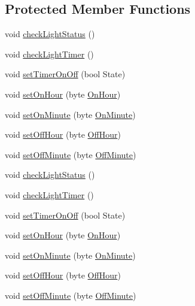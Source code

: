 \subsection*{Protected Member Functions}
\begin{DoxyCompactItemize}
\item 
void \hyperlink{class_lights_a358764e84694051f14f8cdc89dab44ee}{check\+Light\+Status} ()
\item 
void \hyperlink{class_lights_a291179d021dad8a22d3f27203fcaa819}{check\+Light\+Timer} ()
\item 
void \hyperlink{class_lights_a3c5051babf4dacdeecced14217f6f886}{set\+Timer\+On\+Off} (bool State)
\item 
void \hyperlink{class_lights_ad95bf16e17afbf909d480e995a3c214f}{set\+On\+Hour} (byte \hyperlink{class_lights_a40dc32d057dbf4c0e7e840fce2ac3a2d}{On\+Hour})
\item 
void \hyperlink{class_lights_a809f813dc9401c658869b44b44beac75}{set\+On\+Minute} (byte \hyperlink{class_lights_ac94ddb9da64af75953b178fb852ef936}{On\+Minute})
\item 
void \hyperlink{class_lights_a744c6694c60c9f003bf1f88273437d89}{set\+Off\+Hour} (byte \hyperlink{class_lights_a0848dbae7fe968b7ade25ed517178968}{Off\+Hour})
\item 
void \hyperlink{class_lights_a922d225ef5a95478c3a8396f49685c77}{set\+Off\+Minute} (byte \hyperlink{class_lights_ad9d9a09fbfeb6843116a0d77f1e947dd}{Off\+Minute})
\item 
void \hyperlink{class_lights_a358764e84694051f14f8cdc89dab44ee}{check\+Light\+Status} ()
\item 
void \hyperlink{class_lights_a291179d021dad8a22d3f27203fcaa819}{check\+Light\+Timer} ()
\item 
void \hyperlink{class_lights_a3c5051babf4dacdeecced14217f6f886}{set\+Timer\+On\+Off} (bool State)
\item 
void \hyperlink{class_lights_ad95bf16e17afbf909d480e995a3c214f}{set\+On\+Hour} (byte \hyperlink{class_lights_a40dc32d057dbf4c0e7e840fce2ac3a2d}{On\+Hour})
\item 
void \hyperlink{class_lights_a809f813dc9401c658869b44b44beac75}{set\+On\+Minute} (byte \hyperlink{class_lights_ac94ddb9da64af75953b178fb852ef936}{On\+Minute})
\item 
void \hyperlink{class_lights_a744c6694c60c9f003bf1f88273437d89}{set\+Off\+Hour} (byte \hyperlink{class_lights_a0848dbae7fe968b7ade25ed517178968}{Off\+Hour})
\item 
void \hyperlink{class_lights_a922d225ef5a95478c3a8396f49685c77}{set\+Off\+Minute} (byte \hyperlink{class_lights_ad9d9a09fbfeb6843116a0d77f1e947dd}{Off\+Minute})
\end{DoxyCompactItemize}
